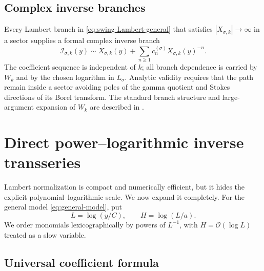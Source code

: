 \documentclass[11pt,a4paper]{article}
\numberwithin{equation}{section}
\theoremstyle{definition}
\theoremstyle{remark}
\newcommand{\Ord}{\mathcal O}
\begin{document}
\subsection{Complex inverse branches}

Every Lambert branch in \cref{eq:swing-Lambert-general} that satisfies
\(|X_{\sigma,k}|\to\infty\) in a sector supplies a formal complex inverse
branch
\begin{equation}\label{eq:complex-inverse-branches}
 \mathcal I_{\sigma,k}(y)
 \sim X_{\sigma,k}(y)+
      \sum_{n\ge1}c_n^{(\sigma)}X_{\sigma,k}(y)^{-n}.
\end{equation}
The coefficient sequence is independent of \(k\); all branch dependence is
carried by \(W_k\) and by the chosen logarithm in \(L_\sigma\).  Analytic
validity requires that the path remain inside a sector avoiding poles of the
gamma quotient and Stokes directions of its Borel transform.  The standard
branch structure and large-argument expansion of \(W_k\) are described in
\cite{CorlessLambertW,DLMFLambertW}.

\section{Direct power--logarithmic inverse transseries}
\label{sec:direct-inverse}

Lambert normalization is compact and numerically efficient, but it hides the
explicit polynomial--logarithmic scale.  We now expand it completely.  For
the general model \cref{eq:general-model}, put
\begin{equation}\label{eq:L-H-general}
 L=\log(y/C),\qquad H=\log(L/a).
\end{equation}
We order monomials lexicographically by powers of \(L^{-1}\), with
\(H=\Ord(\log L)\) treated as a slow variable.

\subsection{Universal coefficient formula}
\end{document}
